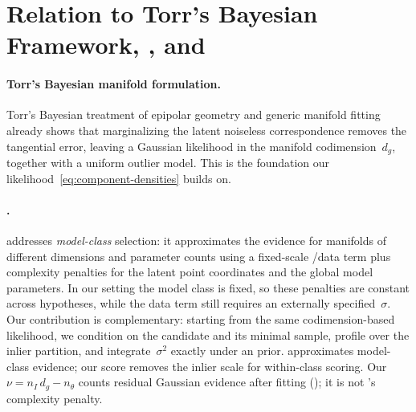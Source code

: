 \section{Relation to Torr's Bayesian Framework, \gric, and \magsacpp}
\label{sec:supp-torr}

\paragraph{Torr's Bayesian manifold formulation.}
Torr's Bayesian treatment of epipolar geometry and generic manifold
fitting~\cite{Torr2002} already shows that marginalizing the latent
noiseless correspondence removes the tangential error, leaving a
Gaussian likelihood in the manifold codimension~$d_g$, together with a
uniform outlier model.  This is the foundation our
likelihood~\eqref{eq:component-densities} builds on.

\paragraph{\gric.}
\gric addresses \emph{model-class} selection: it approximates the
evidence for manifolds of different dimensions and parameter counts
using a fixed-scale \mapsac/\msac data term plus complexity penalties
for the latent point coordinates and the global model parameters.  In
our setting the model class is fixed, so these penalties are constant
across hypotheses, while the data term still requires an externally
specified~$\sigma$.  Our contribution is complementary: starting from
the same codimension-based \gaussunif likelihood, we condition
on the candidate and its minimal sample, profile over the inlier
partition, and integrate~$\sigma^2$ exactly under an \invgamma
prior.  \gric approximates model-class evidence; our score removes the
inlier scale for within-class \ransac scoring.  Our $\nu = n_I\,d_g -
n_\theta$ counts residual Gaussian evidence after fitting
(); it is not \gric's complexity penalty.

